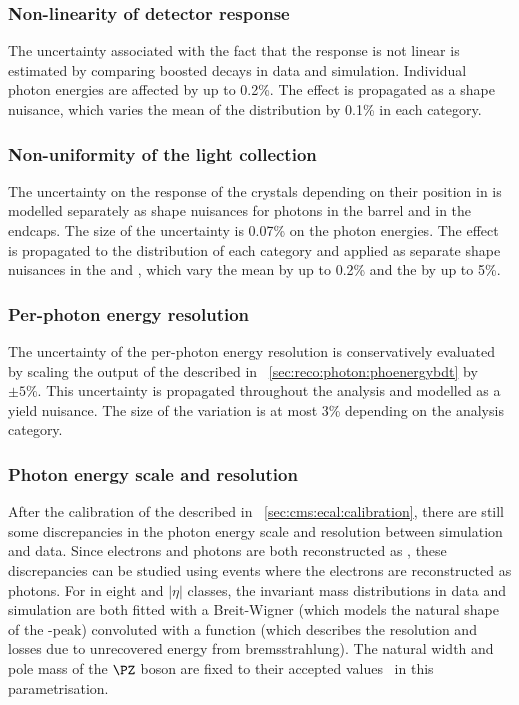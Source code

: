 \subsubsection{Non-linearity of detector response}
The uncertainty associated with the fact that the \ECAL response is not linear is estimated by comparing boosted \Zee decays in data and simulation. Individual photon energies are affected by up to 0.2\%. The effect is propagated as a shape nuisance, which varies the mean of the \mgg distribution by 0.1\% in each category.

\subsubsection{Non-uniformity of the light collection}
The uncertainty on the response of the \ECAL crystals depending on their position in \eta is modelled separately as shape nuisances for photons in the barrel and in the endcaps. The size of the uncertainty is 0.07\% on the photon energies. The effect is propagated to the \mgg distribution of each category and applied as separate shape nuisances in the \EE and \EB, which vary the mean by up to 0.2\% and the \effSigma by up to 5\%.

\subsubsection{Per-photon energy resolution}
The uncertainty of the per-photon energy resolution is conservatively evaluated by scaling the output of the \PhoEnergyBdt described in \Sec~\ref{sec:reco:photon:phoenergybdt} by $\pm5\%$. This uncertainty is propagated throughout the analysis and modelled as a yield nuisance. The size of the variation is at most 3\% depending on the analysis category.

\subsubsection{Photon energy scale and resolution}
After the calibration of the \ECAL described in \Sec~\ref{sec:cms:ecal:calibration}, there are still some discrepancies in the photon energy scale and resolution between simulation and data. Since electrons and photons are both reconstructed as \SC\s, these discrepancies can be studied using \Zee events where the electrons are reconstructed as photons.
For \SC\s in eight \RNINE and $|\eta|$ classes, the invariant mass distributions in data and simulation are both fitted with a Breit-Wigner (which models the natural shape of the \PZ-peak) convoluted with a \CB function (which describes the \ECAL resolution and losses due to unrecovered energy from bremsstrahlung). The natural width and pole mass of the $\PZ$ boson are fixed to their accepted values~\cite{PDGBooklet} in this parametrisation. 

